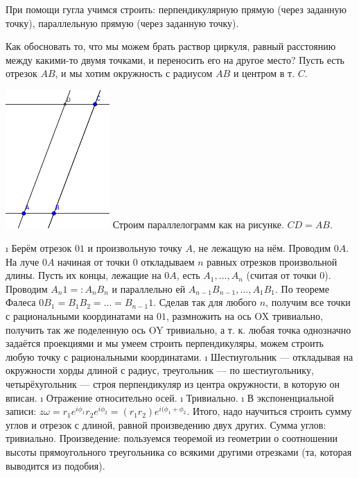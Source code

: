 \begin{solution}
При помощи гугла учимся строить: перпендикулярную прямую (через заданную точку), параллельную прямую (через заданную точку).

Как обосновать то, что мы можем брать раствор циркуля, равный расстоянию между какими-то двумя точками, и переносить его на другое место?
Пусть есть отрезок \(AB\), и мы хотим окружность с радиусом \(AB\) и центром в т. \(C\).

\includegraphics[width=1.56250in]{parallelogram.png}
Строим параллелограмм как на рисунке.
\(CD = AB\).

\begin{enumerate}
\def\labelenumi{\alph{enumi})}
\i
  Берём отрезок \(01\) и произвольную точку \(A\), не лежащую на нём. Проводим \(0A\). На луче \(0A\) начиная от точки \(0\) откладываем \(n\) равных отрезков произвольной длины. Пусть их концы, лежащие на \(0A\), есть \(A_1, \dots, A_n\) (считая от точки \(0\)). Проводим \(A_n1 =: A_n B_n\) и параллельно ей \(A_{n-1}B_{n-1}, \dots, A_1B_1\). По теореме Фалеса \(0B_1 = B_1B_2 = \dots = B_{n-1}1\). Сделав так для любого \(n\), получим все точки с рациональными координатами на \(01\), размножить на ось OX тривиально, получить так же поделенную ось OY тривиально, а т. к. любая точка однозначно задаётся проекциями и мы умеем строить перпендикуляры, можем строить любую точку с рациональными координатами.
\i
  Шестиугольник --- откладывая на окружности хорды длиной с радиус, треугольник --- по шестиугольнику, четырёхугольник --- строя перпендикуляр из центра окружности, в которую он вписан.
\i
  Отражение относительно осей.
\i
  Тривиально.
\i
  В экспоненциальной записи: \(z\omega = r_1e^{i\phi_1}r_2e^{i\phi_2}=(r_1r_2)e^{i(\phi_1 +\phi_2}\).
  Итого, надо научиться строить сумму углов и отрезок с длиной, равной произведению двух других. Сумма углов: тривиально.
  Произведение: пользуемся теоремой из геометрии о соотношении высоты прямоугольного треугольника со всякими другими отрезками (та, которая выводится из подобия).


\end{enumerate}
\end{solution}
